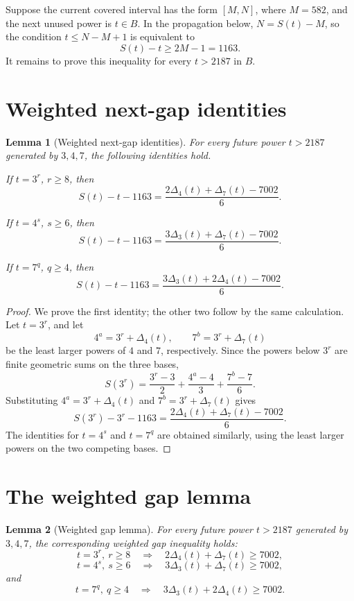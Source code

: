 \documentclass[11pt]{article}
\newtheorem{lemma}{Lemma}
\begin{document}
Suppose the current covered interval has the form \([M,N]\), where \(M=582\), and
the next unused power is \(t\in B\). In the propagation below, \(N=S(t)-M\), so the
condition \(t\le N-M+1\) is equivalent to
\[
S(t)-t\ge 2M-1=1163.
\]
It remains to prove this inequality for every \(t>2187\) in \(B\).

\section{Weighted next-gap identities}

\begin{lemma}[Weighted next-gap identities]
For every future power \(t>2187\) generated by \(3,4,7\), the following identities
hold.

If \(t=3^r\), \(r\ge8\), then
\[
S(t)-t-1163=\frac{2\Delta_4(t)+\Delta_7(t)-7002}{6}.
\]

If \(t=4^s\), \(s\ge6\), then
\[
S(t)-t-1163=\frac{3\Delta_3(t)+\Delta_7(t)-7002}{6}.
\]

If \(t=7^q\), \(q\ge4\), then
\[
S(t)-t-1163=\frac{3\Delta_3(t)+2\Delta_4(t)-7002}{6}.
\]
\end{lemma}

\begin{proof}
We prove the first identity; the other two follow by the same calculation. Let
\(t=3^r\), and let
\[
4^a=3^r+\Delta_4(t),\qquad 7^b=3^r+\Delta_7(t)
\]
be the least larger powers of \(4\) and \(7\), respectively. Since the powers below
\(3^r\) are finite geometric sums on the three bases,
\[
S(3^r)=\frac{3^r-3}{2}+\frac{4^a-4}{3}+\frac{7^b-7}{6}.
\]
Substituting \(4^a=3^r+\Delta_4(t)\) and
\(7^b=3^r+\Delta_7(t)\) gives
\[
S(3^r)-3^r-1163
=
\frac{2\Delta_4(t)+\Delta_7(t)-7002}{6}.
\]
The identities for \(t=4^s\) and \(t=7^q\) are obtained similarly, using the least
larger powers on the two competing bases.
\end{proof}

\section{The weighted gap lemma}

\begin{lemma}[Weighted gap lemma]
For every future power \(t>2187\) generated by \(3,4,7\), the corresponding
weighted gap inequality holds:
\[
t=3^r,\ r\ge8
\quad\Longrightarrow\quad
2\Delta_4(t)+\Delta_7(t)\ge7002,
\]
\[
t=4^s,\ s\ge6
\quad\Longrightarrow\quad
3\Delta_3(t)+\Delta_7(t)\ge7002,
\]
and
\[
t=7^q,\ q\ge4
\quad\Longrightarrow\quad
3\Delta_3(t)+2\Delta_4(t)\ge7002.
\]
\end{lemma}
\end{document}
